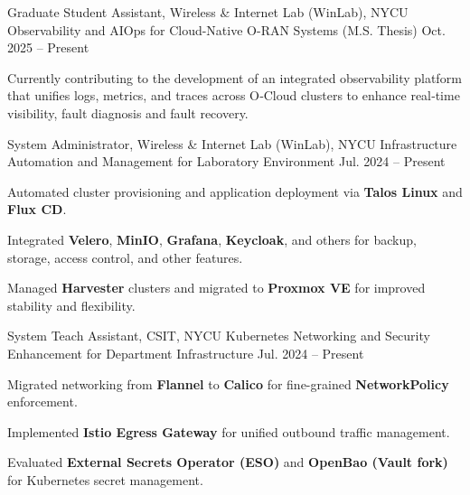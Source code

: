 
\begin{cventries}

    \cventry
    {Graduate Student Assistant, Wireless \& Internet Lab (WinLab), NYCU} %
    {Observability and AIOps for Cloud-Native O-RAN Systems (M.S. Thesis)} %
    {} %
    {Oct. 2025 -- Present} %
    {
      \begin{cvitems}
        \item {Currently contributing to the development of an integrated observability platform that unifies logs, metrics, and traces
across O‑Cloud clusters to enhance real‑time visibility, fault diagnosis and fault recovery.}
      \end{cvitems}
    }
  \cventry
  {System Administrator, Wireless \& Internet Lab (WinLab), NYCU} %
  {Infrastructure Automation and Management for Laboratory Environment} %
  {} %
  {Jul. 2024 -- Present} %
  {
    \begin{cvitems}
      \item {Automated cluster provisioning and application deployment via \textbf{Talos Linux} and \textbf{Flux CD}.}
      \item {Integrated \textbf{Velero}, \textbf{MinIO}, \textbf{Grafana}, \textbf{Keycloak}, and others for backup, storage, access control, and other features.}
      \item {Managed \textbf{Harvester} clusters and migrated to \textbf{Proxmox VE} for improved stability and flexibility.}
    \end{cvitems}
  }
  \cventry
  {System Teach Assistant, CSIT, NYCU} %
  {Kubernetes Networking and Security Enhancement for Department Infrastructure} %
  {} %
  {Jul. 2024 -- Present} %
  {
    \begin{cvitems}
      \item {Migrated networking from \textbf{Flannel} to \textbf{Calico} for fine-grained \textbf{NetworkPolicy} enforcement.}
      \item { Implemented \textbf{Istio Egress Gateway} for unified outbound traffic management.}
      \item {Evaluated \textbf{External Secrets Operator (ESO)} and \textbf{OpenBao (Vault fork)} for Kubernetes secret management.}
    \end{cvitems}
  }


\end{cventries}

